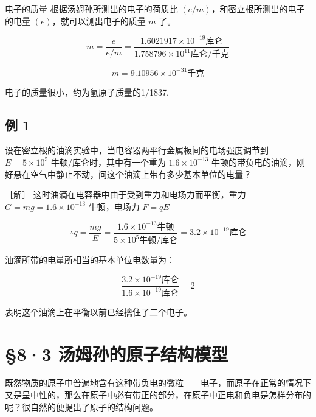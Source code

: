 电子的质量 根据汤姆孙所测出的电子的荷质比
\((e/m)\)，和密立根所测出的电子的电量 \((e)\)，就可以测出电子的质量
\(m\) 了。

\[
m = \frac {e}{e / m} = \frac {1.6021917 \times 10 ^ {- 19} \text{库仑}}{1.758796 \times 10 ^ {11} \text{库仑/千克}}
\]

\[
m = 9.10956 \times 10 ^ {- 31} \text{千克}
\]

电子的质量很小，约为氢原子质量的1/1837.

\subsection{例 1}

设在密立根的油滴实验中，当电容器两平行金属板间的电场强度调节到
\(E = 5 \times 10^{5}\) 牛顿/库仑时，其中有一个重为
\(1.6 \times 10^{-13}\)
牛顿的带负电的油滴，刚好悬在空气中静止不动，问这个油滴上带有多少基本单位的电量？

［解］ 这时油滴在电容器中由于受到重力和电场力而平衡，重力
\(G = mg = 1.6 \times 10^{-13}\) 牛顿，电场力 \(F = qE\)

\[
\therefore q = \frac {m g}{E} = \frac {1.6 \times 10 ^ {- 13} \text{牛顿}}{5 \times 10 ^ {5} \text{牛顿/库仑}} = 3.2 \times 10 ^ {- 19} \text{库仑}
\]

油滴所带的电量所相当的基本单位电数量为：

\[
\frac {3.2 \times 10 ^ {- 19} \text{库仑}}{1.6 \times 10 ^ {- 19} \text{库仑}} = 2
\]

表明这个油滴上在平衡以前已经擒住了二个电子。

\section{§8·3
汤姆孙的原子结构模型}

既然物质的原子中普遍地含有这种带负电的微粒------电子，而原子在正常的情况下又是呈中性的，那么在原子中必有带正的部分，在原子中正电和负电是怎样分布的呢？很自然的便提出了原子的结构问题。

